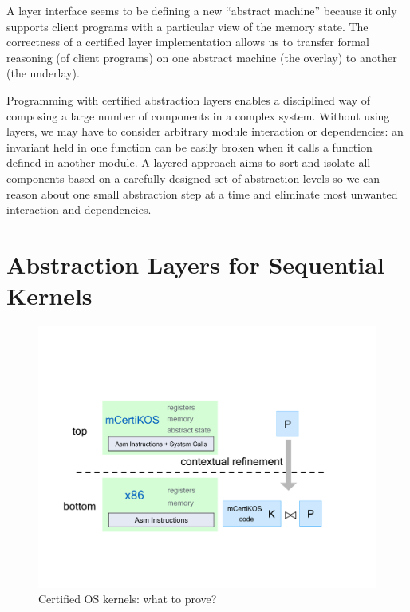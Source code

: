 A layer interface seems to be defining a new ``abstract machine''
because it only supports client programs with a particular view of the
memory state. The correctness of a certified layer implementation
allows us to transfer formal reasoning (of client programs) on one
abstract machine (the overlay) to another (the underlay).  

Programming with certified abstraction layers enables a disciplined way of
composing a large number of components in a complex system. Without
using layers, we may have to consider arbitrary module interaction or
dependencies: an invariant held in one function can be easily broken
when it calls a function defined in another module. A layered approach
aims to sort and isolate all components based on a carefully designed
set of abstraction levels so we can reason about one small abstraction
step at a time and eliminate most unwanted interaction and dependencies.



\section{Abstraction Layers for Sequential Kernels}

\begin{figure}[tb] \centering
\includegraphics[scale=.5]{figs/mainthm}
\caption{Certified OS kernels: what to prove?}
\hrulefill
\label{fig:mainthm}
\end{figure}

